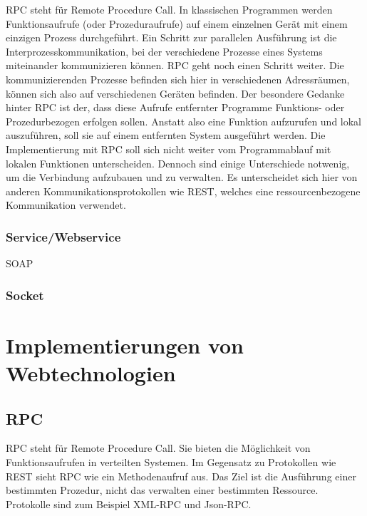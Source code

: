 \documentclass[a4paper,10pt]{article}
\begin{document}
RPC steht für Remote Procedure Call.
In klassischen Programmen werden Funktionsaufrufe (oder Prozeduraufrufe) auf einem einzelnen Gerät mit einem einzigen Prozess durchgeführt.
Ein Schritt zur parallelen Ausführung ist die Interprozesskommunikation, bei der verschiedene Prozesse eines Systems miteinander kommunizieren können.
RPC geht noch einen Schritt weiter.
Die kommunizierenden Prozesse befinden sich hier in verschiedenen Adressräumen, können sich also auf verschiedenen Geräten befinden.
Der besondere Gedanke hinter RPC ist der, dass diese Aufrufe entfernter Programme Funktions- oder Prozedurbezogen erfolgen sollen.
Anstatt also eine Funktion aufzurufen und lokal auszuführen, soll sie auf einem entfernten System ausgeführt werden.
Die Implementierung mit RPC soll sich nicht weiter vom Programmablauf mit lokalen Funktionen unterscheiden.
Dennoch sind einige Unterschiede notwenig, um die Verbindung aufzubauen und zu verwalten.
Es unterscheidet sich hier von anderen Kommunikationsprotokollen wie REST, welches eine ressourcenbezogene Kommunikation verwendet.

\subsubsection{Service/Webservice}
SOAP

\subsubsection{Socket}

\newpage













\section{Implementierungen von Webtechnologien}

\subsection{RPC}


RPC steht für Remote Procedure Call.
Sie bieten die Möglichkeit von Funktionsaufrufen in verteilten Systemen.
Im Gegensatz zu Protokollen wie REST sieht RPC wie ein Methodenaufruf aus.
Das Ziel ist die Ausführung einer bestimmten Prozedur, nicht das verwalten einer bestimmten Ressource.
Protokolle sind zum Beispiel XML-RPC und Json-RPC.
\end{document}
